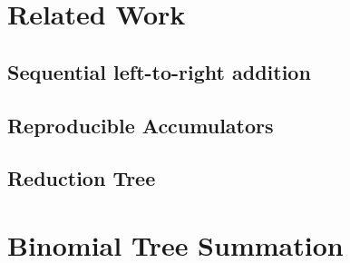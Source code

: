 \chapter{Related Work}
\label{ch:RelatedWork}

\section{Sequential left-to-right addition}
\label{sec:SequentialLeftToRightAddition}

\section{Reproducible Accumulators}
\label{sec:Reproducible Accumulators}

\section{Reduction Tree}
\label{sec:ReductionTree}

\chapter{Binomial Tree Summation}
\label{ch:BinomialTreeSummation}